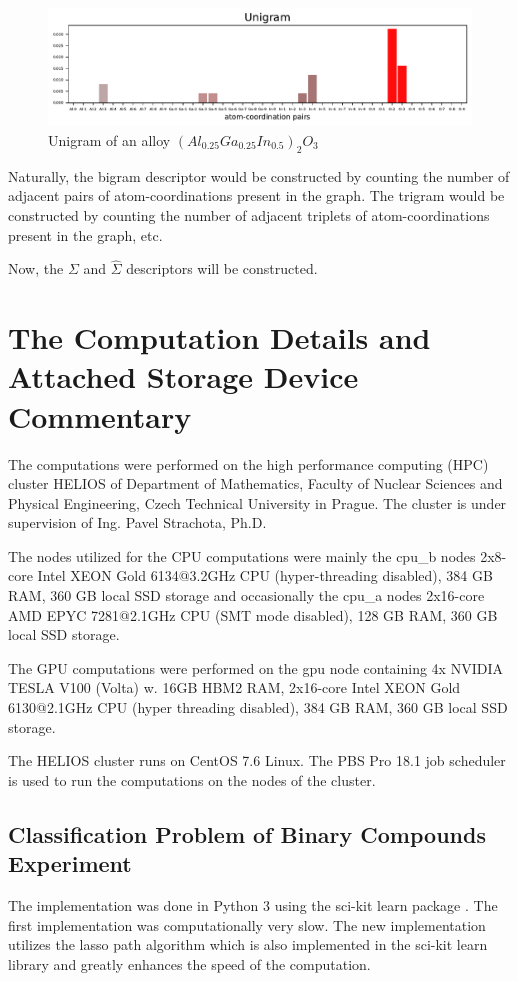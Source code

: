 \documentclass[11pt,oneside,czech,american]{book} %
\theoremstyle{definition} %
\theoremstyle{definition}
\begin{document}
\begin{figure}[H]
	\centering
	\includegraphics[scale=.85]{unigram_id_20.pdf}
	\caption{Unigram of an alloy $(Al_{0.25}Ga_{0.25}In_{0.5})_2 O_3$}
	\label{unigram}
\end{figure}
Naturally, the bigram descriptor would be constructed by counting the number of adjacent  pairs of atom-coordinations present in the graph. The trigram would be constructed by counting the number of adjacent triplets of atom-coordinations present in the graph, etc.

Now, the $\Sigma$ and $\hat{\Sigma}$ descriptors will be constructed.



\chapter{The Computation Details and Attached Storage Device Commentary}{\label{comments_appendix}}
The computations were performed on the high performance computing (HPC) cluster HELIOS of Department of Mathematics, Faculty of Nuclear Sciences and Physical Engineering, Czech Technical University in Prague. The cluster is under supervision of Ing. Pavel Strachota, Ph.D.

The nodes utilized for the CPU computations were mainly the cpu\_b nodes 2x8-core Intel XEON Gold 6134@3.2GHz CPU (hyper-threading disabled), 384 GB RAM, 360 GB local SSD storage and occasionally the cpu\_a nodes 2x16-core AMD EPYC 7281@2.1GHz CPU (SMT mode disabled), 128 GB RAM, 360 GB local SSD storage.

The GPU computations were performed on the gpu node containing 4x NVIDIA TESLA V100 (Volta) w. 16GB HBM2 RAM, 2x16-core Intel XEON Gold 6130@2.1GHz CPU (hyper threading disabled), 384 GB RAM, 360 GB local SSD storage.

The HELIOS cluster runs on CentOS 7.6 Linux. The PBS Pro 18.1 job scheduler is used to run the computations on the nodes of the cluster.

\section{Classification Problem of Binary Compounds Experiment}
The implementation was done in Python 3 using the sci-kit learn package \parencite{sklearn_api}. The first implementation was computationally very slow. The new implementation utilizes the lasso path algorithm \parencite{tibshirani11} which is also implemented in the sci-kit learn library and greatly enhances the speed of the computation.
\end{document}
